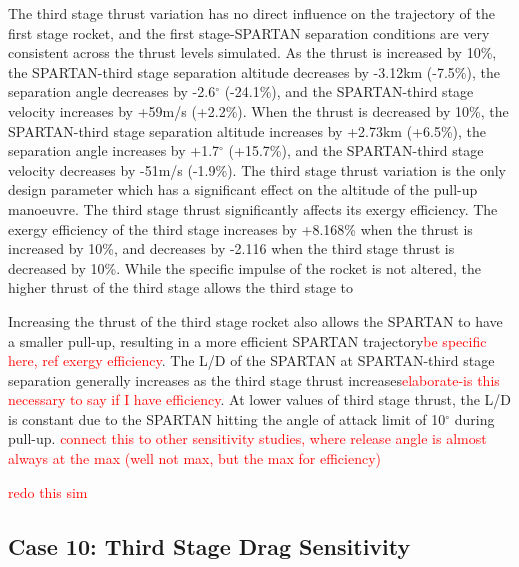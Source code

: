 The third stage thrust variation has no direct influence on the trajectory of the first stage rocket, and the first stage-SPARTAN separation conditions are very consistent across the thrust levels simulated.
As the thrust is increased by 10\%, the SPARTAN-third stage separation altitude decreases by -3.12km (-7.5\%), the separation angle decreases by -2.6$^\circ$ (-24.1\%), and the SPARTAN-third stage velocity increases by +59m/s (+2.2\%).
 When the thrust is decreased by 10\%, the SPARTAN-third stage separation altitude increases by +2.73km (+6.5\%), the separation angle increases by +1.7$^\circ$ (+15.7\%), and the SPARTAN-third stage velocity decreases by -51m/s (-1.9\%).
The third stage thrust variation is the only design parameter which has a significant effect on the altitude of the pull-up manoeuvre. The third stage thrust significantly affects its exergy efficiency. The exergy efficiency of the third stage increases by +8.168\% when the thrust is increased by 10\%, and decreases by -2.116 when the third stage thrust is decreased by 10\%. 
While the specific impulse of the rocket is not altered, the higher thrust of the third stage allows the third stage to 


Increasing the thrust of the third stage rocket also allows the SPARTAN to have a smaller pull-up, resulting in a more efficient SPARTAN trajectory\textcolor{red}{be specific here, ref exergy efficiency}. The L/D of the SPARTAN at SPARTAN-third stage separation generally increases as the third stage thrust increases\textcolor{red}{elaborate-is this necessary to say if I have efficiency}. At lower values of third stage thrust, the L/D is constant due to the SPARTAN hitting the angle of attack limit of 10$^\circ$ during pull-up. 
\textcolor{red}{connect this to other sensitivity studies, where release angle is almost always at the max (well not max, but the max for efficiency)}

\textcolor{red}{redo this sim}


\subsection{Case 10: Third Stage Drag Sensitivity}

